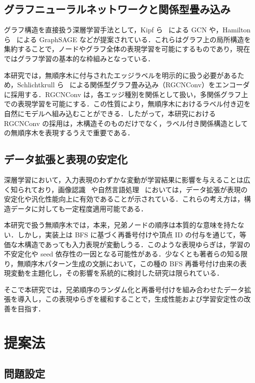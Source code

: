 \documentclass[submit,techrep,noauthor]{ipsj}
\begin{document}
\subsection{グラフニューラルネットワークと関係型畳み込み}

グラフ構造を直接扱う深層学習手法として，Kipf ら~\cite{kipf2017} による GCN や，Hamilton ら~\cite{hamilton2017} による GraphSAGE などが提案されている．これらはグラフ上の局所構造を集約することで，ノードやグラフ全体の表現学習を可能にするものであり，現在ではグラフ学習の基本的な枠組みとなっている．

本研究では，無順序木に付与されたエッジラベルを明示的に扱う必要があるため，Schlichtkrull ら~\cite{schlichtkrull2018} による関係型グラフ畳み込み（RGCNConv）をエンコーダに採用する．RGCNConv は，各エッジ種別を関係として扱い，多関係グラフ上での表現学習を可能にする．この性質により，無順序木におけるラベル付き辺を自然にモデルへ組み込むことができる．したがって，本研究における RGCNConv の採用は，木構造そのものだけでなく，ラベル付き関係構造としての無順序木を表現するうえで重要である．

\subsection{データ拡張と表現の安定化}

深層学習において，入力表現のわずかな変動が学習結果に影響を与えることは広く知られており，画像認識~\cite{shorten2019} や自然言語処理~\cite{wei2019} においては，データ拡張が表現の安定化や汎化性能向上に有効であることが示されている．これらの考え方は，構造データに対しても一定程度適用可能である．

本研究で扱う無順序木では，本来，兄弟ノードの順序は本質的な意味を持たない．しかし，実装上は BFS に基づく再番号付けや頂点 ID の付与を通じて，等価な木構造であっても入力表現が変動しうる．このような表現ゆらぎは，学習の不安定化や seed 依存性の一因となる可能性がある．少なくとも著者らの知る限り，無順序木パターン生成の文脈において，この種の BFS 再番号付け由来の表現変動を主題化し，その影響を系統的に検討した研究は限られている．

そこで本研究では，兄弟順序のランダム化と再番号付けを組み合わせたデータ拡張を導入し，この表現ゆらぎを緩和することで，生成性能および学習安定性の改善を目指す．

\section{提案法}

\subsection{問題設定}
\end{document}
